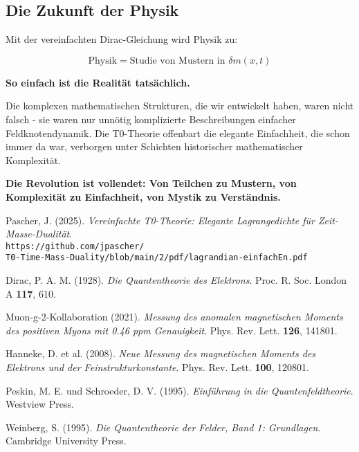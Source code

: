 \documentclass[12pt,a4paper]{article}
\newcommand{\deltam}{\delta m}
\theoremstyle{definition}
\theoremstyle{remark}
\begin{document}
	\subsection{Die Zukunft der Physik}
	
	Mit der vereinfachten Dirac-Gleichung wird Physik zu:
	
	\begin{equation}
		\boxed{\text{Physik} = \text{Studie von Mustern in } \deltam(x,t)}
	\end{equation}
	
	\textbf{So einfach ist die Realität tatsächlich.}
	
	Die komplexen mathematischen Strukturen, die wir entwickelt haben, waren nicht falsch - sie waren nur unnötig komplizierte Beschreibungen einfacher Feldknotendynamik. Die T0-Theorie offenbart die elegante Einfachheit, die schon immer da war, verborgen unter Schichten historischer mathematischer Komplexität.
	
	\textbf{Die Revolution ist vollendet: Von Teilchen zu Mustern, von Komplexität zu Einfachheit, von Mystik zu Verständnis.}
	
	\begin{thebibliography}{99}
		Pascher, J. (2025). \textit{Vereinfachte T0-Theorie: Elegante Lagrangedichte für Zeit-Masse-Dualität}. \\
		\texttt{https://github.com/jpascher/\\T0-Time-Mass-Duality/blob/main/2/pdf/lagrandian-einfachEn.pdf}
		
		Dirac, P. A. M. (1928). \textit{Die Quantentheorie des Elektrons}. Proc. R. Soc. London A \textbf{117}, 610.
		
		Muon-g-2-Kollaboration (2021). \textit{Messung des anomalen magnetischen Moments des positiven Myons mit 0.46 ppm Genauigkeit}. Phys. Rev. Lett. \textbf{126}, 141801.
		
		Hanneke, D. et al. (2008). \textit{Neue Messung des magnetischen Moments des Elektrons und der Feinstrukturkonstante}. Phys. Rev. Lett. \textbf{100}, 120801.
		
		Peskin, M. E. und Schroeder, D. V. (1995). \textit{Einführung in die Quantenfeldtheorie}. Westview Press.
		
		Weinberg, S. (1995). \textit{Die Quantentheorie der Felder, Band 1: Grundlagen}. Cambridge University Press.
	\end{thebibliography}
	
\end{document}

